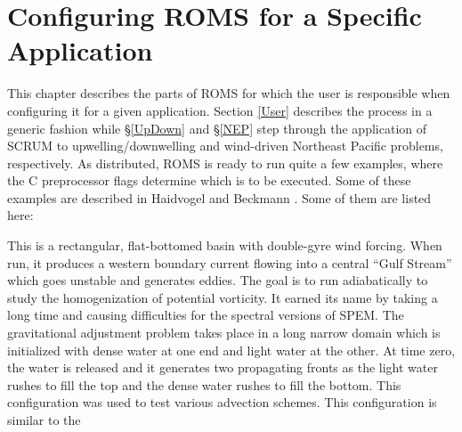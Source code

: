\section{Configuring ROMS for a Specific Application}
\label{Wave}
This chapter describes the parts of ROMS for which the user is
responsible when configuring it for a given application.  Section
\ref{User} describes the process in a generic fashion while
\S\ref{UpDown} and \S\ref{NEP} step through the application of SCRUM
to upwelling/downwelling and wind-driven Northeast Pacific problems,
respectively.  As distributed, ROMS is ready to run quite a few
examples, where the C preprocessor flags determine which is to be
executed.  Some of these examples are described in Haidvogel and
Beckmann \cite{Haidvogel99}. Some of them are listed here:
\begin{klist}
    This is a rectangular, flat-bottomed basin with
 double-gyre wind forcing. When run, it produces a western boundary
 current flowing into a central ``Gulf Stream''
 which goes unstable and generates eddies. The goal is to run
 adiabatically to study the homogenization of potential vorticity.
 It earned its name by taking a long time and causing difficulties
 for the spectral versions of SPEM.
    The gravitational adjustment problem takes place
 in a long narrow domain which is initialized with dense water at one
 end and light water at the other. At time zero, the water is released
 and it generates two propagating fronts as the light water rushes to
 fill the top and the dense water rushes to fill the bottom. This
 configuration was used to test various advection schemes.
      This configuration is similar to the

\end{klist}
